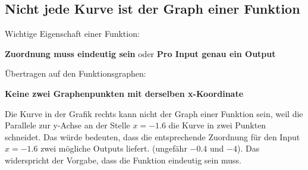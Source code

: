 \subsection{Nicht jede Kurve ist der Graph einer Funktion}
Wichtige Eigenschaft einer Funktion:
\begin{center}
    \textbf{Zuordnung muss eindeutig sein} oder \textbf{Pro Input genau ein Output}
\end{center}
Übertragen auf den Funktionsgraphen:
\begin{center}
    \textbf{Keine zwei Graphenpunkten mit derselben x-Koordinate}
\end{center}
\begin{example}
    \begin{minipage}{0.5\textwidth}
        \begin{center}
        \end{center}
    \end{minipage}
    \begin{minipage}{0.5\textwidth}
        Die Kurve in der Grafik rechts kann nicht der Graph einer Funktion sein, weil die Parallele zur y-Achse an der Stelle $x=-1.6$ die Kurve in zwei Punkten schneidet. Das würde bedeuten, dass die entsprechende Zuordnung für den Input $x=-1.6$ zwei mögliche Outputs liefert. (ungefähr $-0.4$ und $-4$). Das widerspricht der Vorgabe, dass die Funktion eindeutig sein muss.
    \end{minipage}
\end{example}
\newpage
